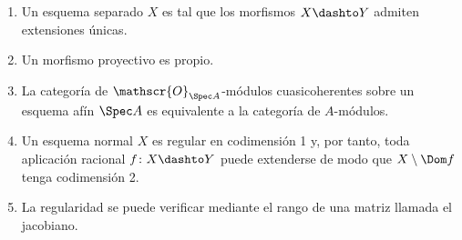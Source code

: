 \documentclass[11pt]{book}
\begin{document}

\begin{enumerate}[resume]
	\item Un esquema separado $X$ es tal que los morfismos $X \dashto Y$ admiten extensiones únicas.
	\item Un morfismo proyectivo es propio.
	\item La categoría de $\mathscr{O}_{\Spec A}$-módulos cuasicoherentes sobre un esquema afín $\Spec A$
		es equivalente a la categoría de $A$-módulos.
	\item Un esquema normal $X$ es regular en codimensión 1 y,
		por tanto, toda aplicación racional $f\colon X \dashto Y$ puede extenderse de modo que $X \setminus \Dom f$ tenga codimensión 2.
	\item La regularidad se puede verificar mediante el rango de una matriz llamada el jacobiano.
\end{enumerate}










\end{document}
